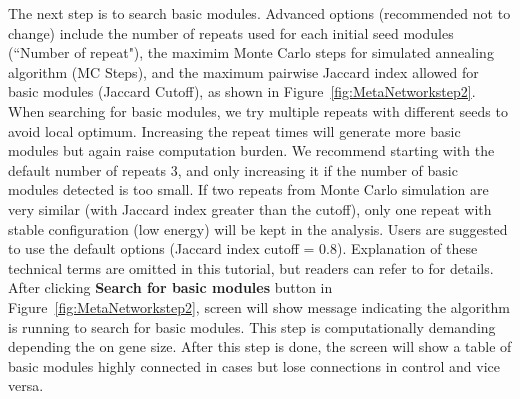 \begin{steps}
The next step is to search basic modules.
Advanced options (recommended not to change) include the number of repeats used for each initial seed modules (``Number of repeat"),
the maximim Monte Carlo steps for simulated annealing algorithm (MC Steps),
and the maximum pairwise Jaccard index allowed for basic modules (Jaccard Cutoff), as shown in Figure~\ref{fig:MetaNetworkstep2}.
When searching for basic modules, 
we try multiple repeats with different seeds to avoid local optimum. 
Increasing the repeat times will generate more basic modules but again raise computation burden. 
We recommend starting with the default number of repeats 3, 
and only increasing it if the number of basic modules detected is too small.
If two repeats from Monte Carlo simulation are very similar (with Jaccard index greater than the cutoff),
only one repeat with stable configuration (low energy) will be kept in the analysis.
Users are suggested to use the default options (Jaccard index cutoff = 0.8).
Explanation of these technical terms are omitted in this tutorial,
but readers can refer to \cite{zhu2016metadcn} for details.
After clicking \textbf{Search for basic modules} button in Figure~\ref{fig:MetaNetworkstep2}, 
screen will show message indicating the algorithm is running to search for basic modules.
This step is computationally demanding depending the on gene size.
After this step is done,
the screen will show a table of basic modules highly connected in cases but lose connections in control and vice versa.



\end{steps}
